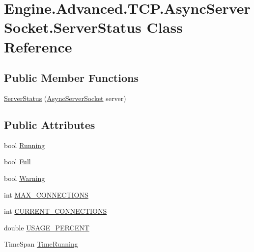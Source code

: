 \hypertarget{class_engine_1_1_advanced_1_1_t_c_p_1_1_async_server_socket_1_1_server_status}{}\section{Engine.\+Advanced.\+T\+C\+P.\+Async\+Server\+Socket.\+Server\+Status Class Reference}
\label{class_engine_1_1_advanced_1_1_t_c_p_1_1_async_server_socket_1_1_server_status}
\subsection*{Public Member Functions}
\begin{DoxyCompactItemize}
\item 
\mbox{\hyperlink{class_engine_1_1_advanced_1_1_t_c_p_1_1_async_server_socket_1_1_server_status_a54a779f4674aa30aa4b5b846202c522a}{Server\+Status}} (\mbox{\hyperlink{class_engine_1_1_advanced_1_1_t_c_p_1_1_async_server_socket}{Async\+Server\+Socket}} server)
\end{DoxyCompactItemize}
\subsection*{Public Attributes}
\begin{DoxyCompactItemize}
\item 
bool \mbox{\hyperlink{class_engine_1_1_advanced_1_1_t_c_p_1_1_async_server_socket_1_1_server_status_a19c0774f8d340e0e7e7452bd1293896f}{Running}}
\item 
bool \mbox{\hyperlink{class_engine_1_1_advanced_1_1_t_c_p_1_1_async_server_socket_1_1_server_status_a3b03acb9089784dea536d0e7ff525cd2}{Full}}
\item 
bool \mbox{\hyperlink{class_engine_1_1_advanced_1_1_t_c_p_1_1_async_server_socket_1_1_server_status_a5851b29b3855a5453b36fa89c452db57}{Warning}}
\item 
int \mbox{\hyperlink{class_engine_1_1_advanced_1_1_t_c_p_1_1_async_server_socket_1_1_server_status_a98edd6b8a125adbcab148898f8157af2}{M\+A\+X\+\_\+\+C\+O\+N\+N\+E\+C\+T\+I\+O\+NS}}
\item 
int \mbox{\hyperlink{class_engine_1_1_advanced_1_1_t_c_p_1_1_async_server_socket_1_1_server_status_a4aaedab4a3d1bd06e06014d309035f85}{C\+U\+R\+R\+E\+N\+T\+\_\+\+C\+O\+N\+N\+E\+C\+T\+I\+O\+NS}}
\item 
double \mbox{\hyperlink{class_engine_1_1_advanced_1_1_t_c_p_1_1_async_server_socket_1_1_server_status_abe292875387e819e58337eeaefddca10}{U\+S\+A\+G\+E\+\_\+\+P\+E\+R\+C\+E\+NT}}
\item 
Time\+Span \mbox{\hyperlink{class_engine_1_1_advanced_1_1_t_c_p_1_1_async_server_socket_1_1_server_status_a761d93d0a27944eee51f9b10c06dcfca}{Time\+Running}}
\end{DoxyCompactItemize}


